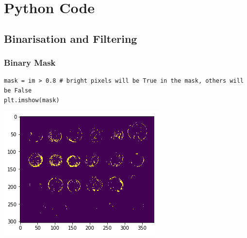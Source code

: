 
\section{Python Code}
\subsection{Binarisation and Filtering}
\subsubsection{Binary Mask}
\begin{verbatim}
mask = im > 0.8 # bright pixels will be True in the mask, others will be False
plt.imshow(mask)
\end{verbatim}
\begin{center}
	\includegraphics[width=0.4\linewidth]{img/BinaryMask.png}
\end{center}

